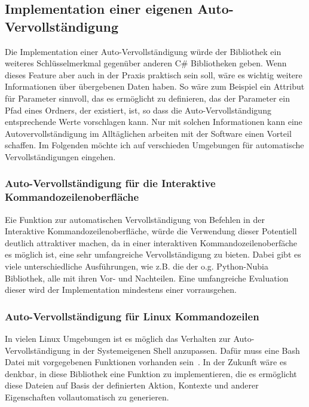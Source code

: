 \documentclass[a4paper,11pt,titlepage,ngerman]{article}
\begin{document}
\begin{sloppypar}
  \subsection{Implementation einer eigenen Auto-Vervollständigung}\label{subsec:Autocomplete}
  Die Implementation einer Auto-Vervollständigung würde der Bibliothek ein weiteres Schlüsselmerkmal gegenüber anderen C\# Bibliotheken geben.
  Wenn dieses Feature aber auch in der Praxis praktisch sein soll, wäre es wichtig weitere Informationen über übergebenen Daten haben.
  So wäre zum Beispiel ein Attribut für Parameter sinnvoll, das es ermöglicht zu definieren, das der Parameter ein Pfad eines Ordners, 
  der existiert, ist, so dass die Auto-Vervollständigung entsprechende Werte vorschlagen kann.
  Nur mit solchen Informationen kann eine Autovervollständigung im Alltäglichen arbeiten mit der Software einen Vorteil schaffen.
  Im Folgenden möchte ich auf verschieden Umgebungen für automatische Vervollständigungen eingehen.
  \subsubsection{Auto-Vervollständigung für die Interaktive Kommandozeilenoberfläche}
  Eie Funktion zur automatischen Vervollständigung von Befehlen in der Interaktive Kommandozeilenoberfläche, würde die Verwendung dieser Potentiell deutlich attraktiver machen, 
  da in einer interaktiven Kommandozeilenoberfäche es möglich ist, eine sehr umfangreiche Vervollständigung zu bieten.
  Dabei gibt es viele unterschiedliche  Ausführungen, wie z.B. die der o.g. Python-Nubia Bibliothek, alle mit ihren Vor- und Nachteilen.
  Eine umfangreiche Evaluation dieser wird der Implementation mindestens einer vorrausgehen. 
  \subsubsection{Auto-Vervollständigung für Linux Kommandozeilen}
  In vielen Linux Umgebungen ist es möglich das Verhalten zur Auto-Vervollständigung in der Systemeigenen Shell anzupassen.
  Dafür muss eine Bash Datei mit vorgegebenen Funktionen vorhanden sein~\cite{BashAutoComplete}.
  In der Zukunft wäre es denkbar, in diese Bibliothek eine Funktion zu implementieren, die es ermöglicht diese Dateien auf Basis der definierten Aktion,
  Kontexte und anderer Eigenschaften vollautomatisch zu generieren.

\end{sloppypar}
\end{document}
